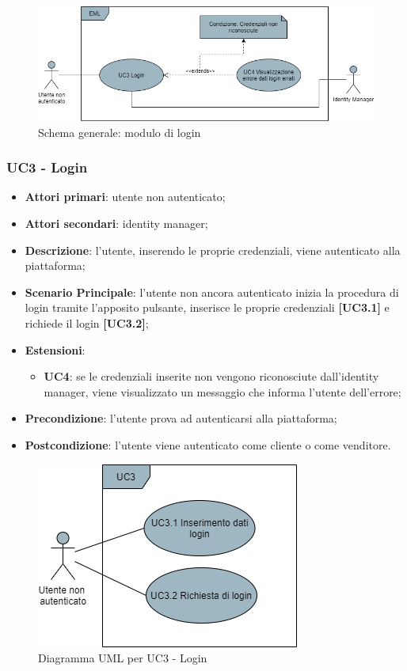 \begin{figure}[H]
\centering
\includegraphics[scale=0.6]{res/UseCase/Immagini/Login}
\caption{Schema generale: modulo di login}
\end{figure}

\subsubsection{UC3 - Login}
\begin{itemize}
\item \textbf{Attori primari}: utente non autenticato;
\item \textbf{Attori secondari}: identity manager;
\item \textbf{Descrizione}: l'utente, inserendo le proprie credenziali, viene autenticato alla piattaforma;
\item \textbf{Scenario Principale}: l'utente non ancora autenticato inizia la procedura di login tramite l'apposito pulsante, inserisce le proprie credenziali \textbf{[UC3.1]} e richiede il login \textbf{[UC3.2]};
\item \textbf{Estensioni}:
\begin{itemize}
	\item \textbf{UC4}: se le credenziali inserite non vengono riconosciute dall'identity manager, viene visualizzato un messaggio che informa l'utente dell'errore;
\end{itemize}
\item \textbf{Precondizione}: l'utente prova ad autenticarsi alla piattaforma;
\item \textbf{Postcondizione}: l'utente viene autenticato come cliente o come venditore.
\end{itemize}

\begin{figure}[H]
\centering
\includegraphics[scale=0.6]{res/UseCase/Immagini/LoginSottocasi}
\caption{Diagramma UML per UC3 - Login}
\end{figure}


